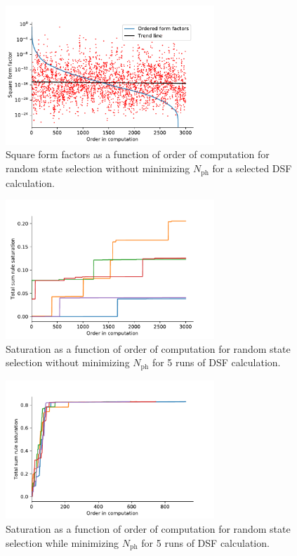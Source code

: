 \documentclass[11pt, a4paper]{report} %
\begin{document}
\begin{figure}[tb!]
  \centering
  \includegraphics[width=0.7\textwidth]{ff_sizes_rand_True_check_train_False_check_eval_False.pdf}
  \caption{Square form factors as a function of order of computation for random state selection without minimizing \(N_{\mathrm{ph}}\) for a selected DSF calculation.}
  \label{fig:ff_sizes_rand_True_check_train_False_check_eval_False}
\end{figure}

\begin{figure}[tb!]
  \centering
  \includegraphics[width=0.7\textwidth]{saturation_histories_rand_True_check_train_False_check_eval_False.pdf}
  \caption{Saturation as a function of order of computation for random state selection without minimizing \(N_{\mathrm{ph}}\) for 5 runs of DSF calculation.}
  \label{fig:saturation_rand_True_check_train_False_check_eval_False}
\end{figure}

\begin{figure}[tb!]
  \centering
  \includegraphics[width=0.7\textwidth]{saturation_histories_rand_True_check_train_False_check_eval_True.pdf}
  \caption{Saturation as a function of order of computation for random state selection while minimizing \(N_{\mathrm{ph}}\) for 5 runs of DSF calculation.}
\end{figure}
\end{document}
